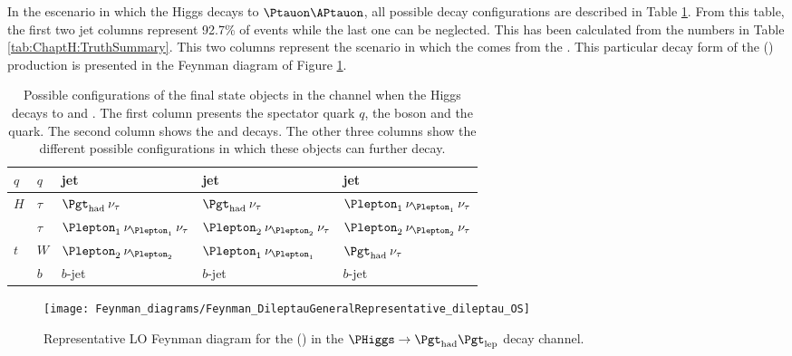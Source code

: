 In the escenario in which the Higgs decays to $\Ptauon \APtauon$, all possible 
decay configurations are described in Table \ref{tab:ChaptH:Reconstuction:Configurations}.
From this table, the first two jet columns represent 92.7\% of \Htautau events 
while the last one can be neglected. This has been calculated from the numbers in Table \ref{tab:ChaptH:TruthSummary}.
This two columns represent the scenario in which the \tauhad comes from the  \PHiggs.
This particular decay form of the  \tHq(\dileptau) production is presented in the Feynman diagram of
Figure \ref{fig:tHq:TruthFeyman}. 


\begin{table}[]
\centering
\begin{tabular}{l|l|l|l|l}
\toprule
 $q$ & $q$ & jet & jet & jet \\ \midrule
 $H$ & $\tau$ & $\tauhad \: \nu_{\tau}$           &  $\tauhad \: \nu_{\tau}$           & $\Plepton_1 \: \nu_{\Plepton_1} \: \nu_{\tau}$ \\ 
     & $\tau$ & $\Plepton_1 \: \nu_{\Plepton_1} \: \nu_{\tau}$ &  $\Plepton_2 \: \nu_{\Plepton_2} \: \nu_{\tau}$ & $\Plepton_2 \: \nu_{\Plepton_2} \: \nu_{\tau}$ \\ \midrule
 $t$ &  $W$   & $\Plepton_2 \: \nu_{\Plepton_2}$               &  $\Plepton_1 \: \nu_{\Plepton_1}$               &  $\tauhad \: \nu_{\tau}$          \\ %
     &  $b$   &  $b$-jet                         &  $b$-jet                          & $b$-jet                          \\ \bottomrule
\end{tabular}
\caption{Possible configurations of the final state objects in the \dileptau channel when the Higgs decays
to \tauhad and \taulep. The first column presents the spectator quark $q$, the \PHiggs boson and the \Ptop quark.
The second column shows the \PHiggs and \Ptop decays. The other three columns show the different possible configurations in 
which these objects can further decay.}
\label{tab:ChaptH:Reconstuction:Configurations}
\end{table}


\begin{figure}[htbp!]
\centering
\texttt{[image: Feynman\_diagrams/Feynman\_DileptauGeneralRepresentative\_dileptau\_OS]}
\caption{Representative LO Feynman diagram for the \tHq (\dileptau) in the $\PHiggs \rightarrow \tauhad \taulep$ decay channel. 
}
\label{fig:tHq:TruthFeyman}
\end{figure}


